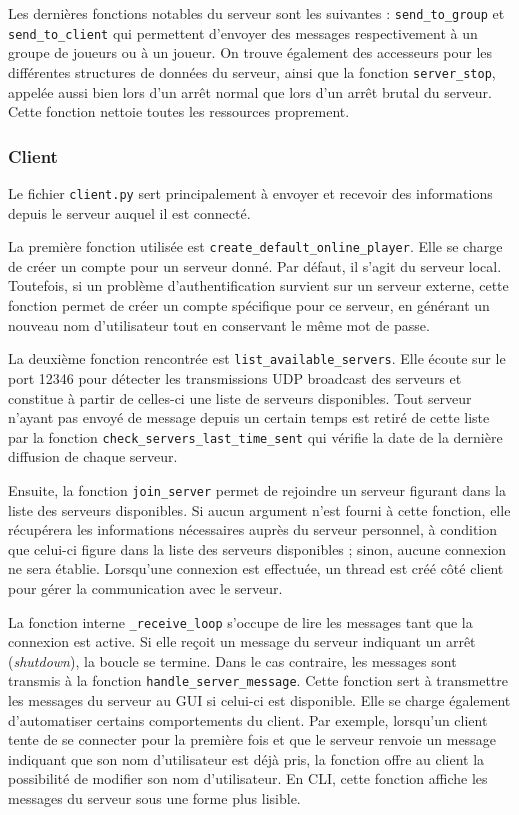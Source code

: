 \documentclass[11pt]{article}
\begin{document}
Les dernières fonctions notables du serveur sont les suivantes : \texttt{send\_to\_group} et \texttt{send\_to\_client} qui permettent d'envoyer des messages respectivement à un groupe de joueurs ou à un joueur. On trouve également des accesseurs pour les différentes structures de données du serveur, ainsi que la fonction \texttt{server\_stop}, appelée aussi bien lors d'un arrêt normal que lors d'un arrêt brutal du serveur. Cette fonction nettoie toutes les ressources proprement.


\subsubsection{Client}
Le fichier \texttt{client.py} sert principalement à envoyer et recevoir des informations depuis le serveur auquel il est connecté.

La première fonction utilisée est \texttt{create\_default\_online\_player}. Elle se charge de créer un compte pour un serveur donné. Par défaut, il s'agit du serveur local. Toutefois, si un problème d'authentification survient sur un serveur externe, cette fonction permet de créer un compte spécifique pour ce serveur, en générant un nouveau nom d'utilisateur tout en conservant le même mot de passe.

La deuxième fonction rencontrée est \texttt{list\_available\_servers}. Elle écoute sur le port 12346 pour détecter les transmissions UDP broadcast des serveurs et constitue à partir de celles-ci une liste de serveurs disponibles. Tout serveur n'ayant pas envoyé de message depuis un certain temps est retiré de cette liste par la fonction \texttt{check\_servers\_last\_time\_sent} qui vérifie la date de la dernière diffusion de chaque serveur.

Ensuite, la fonction \texttt{join\_server} permet de rejoindre un serveur figurant dans la liste des serveurs disponibles. Si aucun argument n'est fourni à cette fonction, elle récupérera les informations nécessaires auprès du serveur personnel, à condition que celui-ci figure dans la liste des serveurs disponibles ; sinon, aucune connexion ne sera établie. Lorsqu'une connexion est effectuée, un thread est créé côté client pour gérer la communication avec le serveur.

La fonction interne \texttt{\_receive\_loop} s'occupe de lire les messages tant que la connexion est active. Si elle reçoit un message du serveur indiquant un arrêt (\textit{shutdown}), la boucle se termine. Dans le cas contraire, les messages sont transmis à la fonction \texttt{handle\_server\_message}. Cette fonction sert à transmettre les messages du serveur au GUI si celui-ci est disponible. Elle se charge également d'automatiser certains comportements du client. Par exemple, lorsqu'un client tente de se connecter pour la première fois et que le serveur renvoie un message indiquant que son nom d'utilisateur est déjà pris, la fonction offre au client la possibilité de modifier son nom d'utilisateur. En CLI, cette fonction affiche les messages du serveur sous une forme plus lisible.
\end{document}
